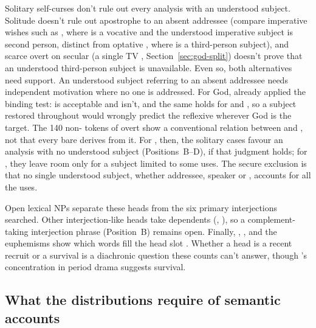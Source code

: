 \documentclass[12pt]{article}
\begin{document}
Solitary self-curses don't rule out every analysis with an understood subject. Solitude doesn't rule out apostrophe to an absent addressee (compare imperative wishes such as , where  is a vocative and the understood imperative subject is second person, distinct from optative , where  is a third-person subject), and scarce overt  on secular  (a single TV , Section~\ref{sec:god-split}) doesn't prove that an understood third-person subject is unavailable. Even so, both alternatives need support. An understood subject referring to an absent addressee needs independent motivation where no one is addressed. For God, \textcite[6]{quang1971} already applied the binding test:  is acceptable and  isn't, and the same holds for  and , so a  subject restored throughout would wrongly predict the reflexive wherever God is the target. The 140 non- tokens of overt  show a conventional relation between  and , not that every bare  derives from it. For , then, the solitary cases favour an analysis with no understood subject (Positions~B--D), if that judgment holds; for , they leave room only for a  subject limited to some uses. The secure exclusion is that no single understood subject, whether addressee, speaker or , accounts for all the uses.

Open lexical NPs separate these heads from the six primary interjections searched. Other interjection-like heads take dependents (, ), so a complement-taking interjection phrase (Position~B) remains open. Finally, , ,  and the euphemisms show which words fill the head slot \citep{mcenery2006,napolihoeksema2009,ljung2011}. Whether a head is a recent recruit or a survival is a diachronic question these counts can't answer, though 's concentration in period drama suggests survival.

\subsection{What the distributions require of semantic accounts}
\label{sec:meaning}
\end{document}
